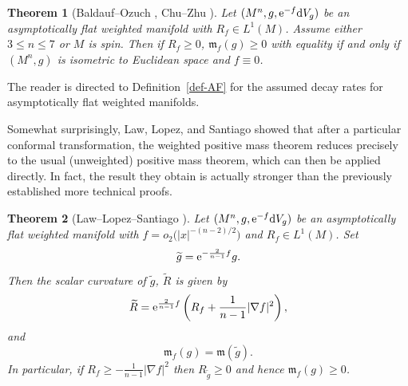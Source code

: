 \documentclass[pdftex]{sigma}
\numberwithin{equation}{section}
\newtheorem{Theorem}{Theorem}[section]
\theoremstyle{definition}
\begin{document}
\begin{Theorem}[Baldauf--Ozuch \cite{BaldaufOzuch22}, Chu--Zhu \cite{ChuZhu24}]\label{thm-BO-CZ}
	Let $(M^n,g,{\rm e}^{-f}{\rm d}V_g)$ be an asymptotically flat weighted manifold with $R_f\in L^1(M)$. Assume either $3\le n\le 7$ or $M$ is spin.
Then if $R_f\ge 0$, $\mathfrak{m}_f(g)\ge 0$ with equality if and only if $(M^n,g)$ is isometric to Euclidean space and $f\equiv0$.
\end{Theorem}
The reader is directed to Definition~\ref{def-AF} for the assumed decay rates for asymptotically flat weighted manifolds.

Somewhat surprisingly, Law, Lopez, and Santiago \cite{LawLopezSantiago24} showed that after a particular conformal transformation, the weighted positive mass theorem reduces precisely to the usual (unweighted) positive mass theorem, which can then be applied directly. In fact, the result they obtain is actually stronger than the previously established more technical proofs.
\begin{Theorem}[Law--Lopez--Santiago \cite{LawLopezSantiago24}]\label{thm-LLS}
Let $(M^n,g,{\rm e}^{-f}{\rm d}V_g)$ be an asymptotically flat weight\-ed manifold with $f=o_2\bigl(|x|^{-(n-2)/2}\bigr)$ and $R_f\in L^1(M)$. Set
	\[
	\widetilde g = {\rm e}^{-\frac{2}{n-1}f} g.
	\]
	Then the scalar curvature of $\widetilde g$, $\widetilde R$ is given by
	\[
	\widetilde R = {\rm e}^{\frac{2}{n-1}f}\left(R_f + \frac{1}{n-1} |\nabla f|^2\right),
	\]
	and
	\[
	\mathfrak{m}_f(g) = \mathfrak{m}(\widetilde g).
	\]
	In particular, if $R_f\ge -\frac{1}{n-1}|\nabla f|^2$ then $R_{\widetilde g}\ge 0$ and hence $\mathfrak{m}_f(g)\ge 0$.
\end{Theorem}
\end{document}
